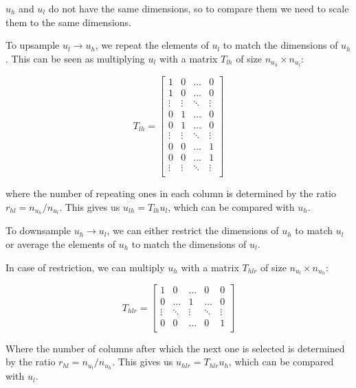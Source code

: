 \documentclass{article}
\begin{document}
$u_h$ and $u_l$ do not have the same dimensions, so to compare them we need to scale them to the same dimensions.

To upsample $u_l \rightarrow u_h$, we repeat the elements of $u_l$ to match the dimensions of $u_h$.
This can be seen as multiplying $u_l$ with a matrix $T_{lh}$ of size $n_{u_h} \times n_{u_l}$:

\begin{equation}
  T_{lh} =
  \begin{bmatrix}
    1 & 0 & \ldots & 0 \\
    1 & 0 & \ldots & 0 \\
    \vdots & \vdots & \ddots & \vdots \\
    0 & 1 & \ldots & 0 \\
    0 & 1 & \ldots & 0 \\
    \vdots & \vdots & \ddots & \vdots \\
    0 & 0 & \ldots & 1 \\
    0 & 0 & \ldots & 1 \\
    \vdots & \vdots & \ddots & \vdots \\
  \end{bmatrix}
\end{equation}

where the number of repeating ones in each column is determined by the ratio $r_{hl} = n_{u_h} / n_{u_l}$.
This gives us $u_{lh} = T_{lh} u_l$, which can be compared with $u_h$.

To downsample $u_h \rightarrow u_l$, we can either restrict the dimensions of $u_h$ to match $u_l$ or average the elements of $u_h$ to match the dimensions of $u_l$.

In case of restriction, we can multiply $u_h$ with a matrix $T_{hlr}$ of size $n_{u_l} \times n_{u_h}$:

\begin{equation}
  T_{hlr} =
  \begin{bmatrix}
    1 & 0 & \ldots & 0 & 0 \\
    0 & \ldots & 1 & \ldots & 0 \\
    \vdots & \ddots & \vdots & \ddots & \vdots \\
    0 & 0 & \ldots & 0 & 1 \\
  \end{bmatrix}
\end{equation}

Where the number of columns after which the next one is selected is determined by the ratio $r_{hl} = n_{u_l} / n_{u_h}$.
This gives us $u_{hlr} = T_{hlr} u_h$, which can be compared with $u_l$.
\end{document}
